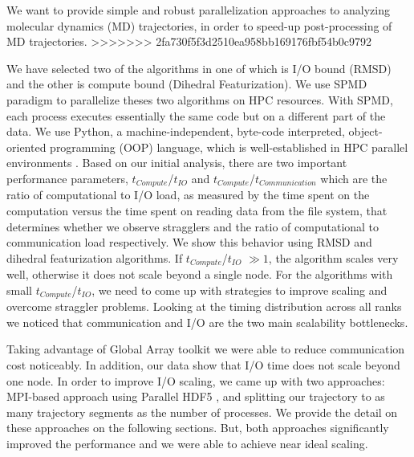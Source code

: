 We want to provide simple and robust parallelization approaches to analyzing molecular dynamics (MD) trajectories, in order to speed-up post-processing of MD trajectories.
>>>>>>> 2fa730f5f3d2510ea958bb169176fbf54b0c9792

We have selected two of the algorithms in  one of which is I/O bound (RMSD) and the other is compute bound (Dihedral Featurization).
We use SPMD paradigm to parallelize theses two algorithms on HPC resources.
With SPMD, each process executes essentially the same code but on a different part of the data. 
We use Python, a machine-independent, byte-code interpreted, object-oriented programming (OOP) language, which is well-established in HPC parallel environments \cite{GAiN}. 
Based on our initial analysis, there are two important performance parameters,  $t_{Compute}$/$t_{IO}$ and $t_{Compute}$/$t_{Communication}$ which are the ratio of computational to I/O load, as measured by the time spent on the computation versus the time spent on reading data from the file system, that determines whether we observe stragglers and the ratio of computational to communication load respectively.
We show this behavior using RMSD and dihedral featurization algorithms.
If $t_{Compute}$/$t_{IO}$  $\gg 1$, the algorithm scales very well, otherwise it does not scale beyond a single node. 
For the algorithms with small $t_{Compute}$/$t_{IO}$, we need to come up with strategies to improve scaling and overcome straggler problems.
Looking at the timing distribution across all ranks we noticed that communication and I/O are the two main scalability bottlenecks.

Taking advantage of Global Array toolkit we were able to reduce communication cost noticeably.
In addition, our data show that I/O time does not scale beyond one node. 
In order to improve I/O scaling, we came up with two approaches: MPI-based approach using Parallel HDF5 \cite{pythonhdf5}, and splitting our trajectory to as many trajectory segments as the number of processes. 
We provide the detail on these approaches on the following sections.
But, both approaches significantly improved the performance and we were able to achieve near ideal scaling.